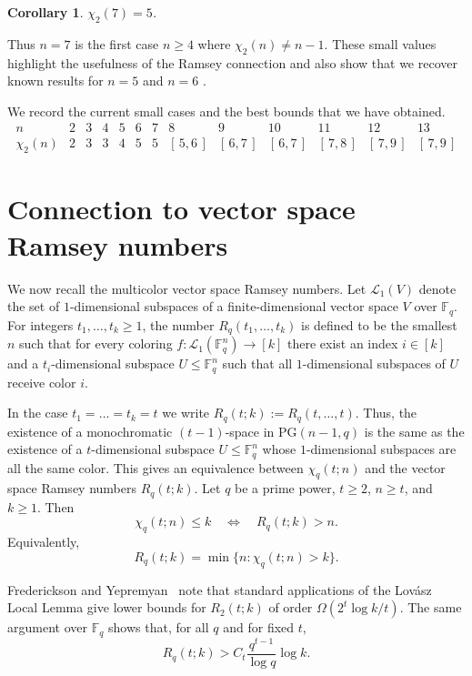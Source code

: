 \documentclass[11pt]{article}
\theoremstyle{plain}
\newtheorem{corollary}{Corollary}
\newcommand{\F}{\mathbb{F}}
\newcommand{\PG}{\mathrm{PG}}
\begin{document}
\begin{corollary}
$\chi_2(7)=5$.
\end{corollary}

Thus $n=7$ is the first case $n\ge 4$ where $\chi_2(n)\ne n-1$.
These small values highlight the usefulness of the Ramsey connection and also show that we recover known results for $n=5$ \cite{Rosa1970-2} and $n=6$ \cite{Fugere1994}.

We record the current small cases and the best bounds that we have obtained.
\[
\begin{array}{c|cccccccccccc}
 n & 2 & 3 & 4 & 5 & 6 & 7 & 8 & 9 & 10 & 11 & 12 & 13 \\ \hline
 \chi_2(n) & 2 & 3 & 3 & 4 & 5 & 5 & [\,5,6\,] & [\,6,7\,] & [\,6,7\,] & [\,7,8\,] & [\,7,9\,] & [\,7,9\,]
\end{array}
\]

\section{Connection to vector space Ramsey numbers}\label{sec:vsrn}

We now recall the multicolor vector space Ramsey numbers.
Let $\mathcal{L}_1(V)$ denote the set of $1$-dimensional subspaces of a finite-dimensional vector space $V$ over $\F_q$.
For integers $t_1,\dots,t_k\ge 1$, the number $R_q(t_1,\dots,t_k)$ is defined to be the smallest $n$ such that for every coloring $f:\mathcal{L}_1(\F_q^n)\to[k]$
there exist an index $i\in[k]$ and a $t_i$-dimensional subspace $U\le \F_q^n$ such that all $1$-dimensional subspaces of $U$ receive color $i$.

In the case $t_1=\dots=t_k=t$ we write $R_q(t;k):=R_q(t,\dots,t)$.
Thus, the existence of a monochromatic $(t-1)$-space in $\PG(n-1,q)$ is the same as the existence of a $t$-dimensional subspace $U \le \F_q^n$ whose $1$-dimensional subspaces are all the same color.
This gives an equivalence between $\chi_q(t;n)$ and the vector space Ramsey numbers $R_q(t;k)$.
Let $q$ be a prime power, $t\ge 2$, $n\ge t$, and $k\ge 1$.
Then
\begin{equation}\label{eq:chi-vs-Rq}
    \chi_q(t;n)\le k \quad\Longleftrightarrow\quad  R_q(t;k)>n.
\end{equation}
Equivalently,
\[
R_q(t; k) = \min \{n : \chi_q(t; n) > k\}.
\]

Frederickson and Yepremyan~\cite{Frederickson2023} note that standard applications of the Lov\'asz Local Lemma give lower bounds for $R_2(t;k)$ of order $\Omega(2^t \log k / t)$.
The same argument over $\F_q$ shows that, for all $q$ and for fixed $t$,
\[
R_q(t;k)>C_t\frac{q^{t-1}}{\log q}\log k.
\]
\end{document}
